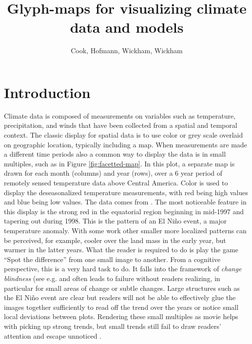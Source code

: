 \documentclass[oneside]{article}
\begin{document}
\title{Glyph-maps for visualizing climate data and models}
\author{Cook, Hofmann, Wickham, Wickham}


%
%
\maketitle

\section{Introduction}

Climate data is composed of measurements on variables such as temperature, precipitation, and winds that have been collected from a spatial and temporal context. The classic display for spatial data is to use color or grey scale overlaid on geographic location, typically including a map. When measurements are made a different time periods also a common way to display the data is in small multiples, such as in Figure \ref{fig:facetted-map}. In this plot, a separate map is drawn for each month (columns) and year (rows), over a 6 year period of remotely sensed temperature data above Central America. Color is used to display the deseasonalized temperature measurements, with red being high values and blue being low values. The data comes from \citet{murrell:2010}. The most noticeable feature in this display is the strong red in the equatorial region beginning in mid-1997 and tapering out during 1998. This is the pattern of an El Ni\~no event, a major temperature anomaly. With some work other smaller more localized patterns can be perceived, for example, cooler over the land mass in the early year, but warmer in the latter years. What the reader is required to do is play the game ``Spot the difference'' from one small image to another. From a cognitive perspective, this is a very hard task to do. It falls into the framework of {\it change blindness} (see e.g. \citet{healey:2011} and often leads to failure without readers realizing, in particular for small areas of change or subtle changes.  Large structures such as the El Ni\~no event are clear but readers will not be able to effectively glue the images together sufficiently to read off the trend over the years or notice small local deviations between plots. Rendering these small multiples as movie helps with picking up strong trends, but small trends still fail to draw readers' attention and escape unnoticed \citep{simons:gradual}.
\end{document}

